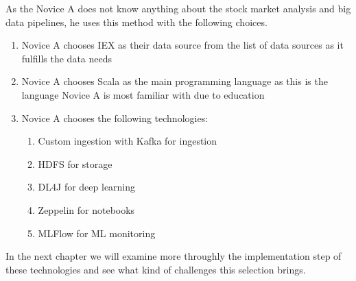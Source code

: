 As the Novice A does not know anything about the stock market analysis and big data pipelines, he uses this method with the following choices.
\begin{enumerate}
    \item Novice A chooses IEX as their data source from the list of data sources as it fulfills the data needs
    \item Novice A chooses Scala as the main programming language as this is the language Novice A is most familiar with due to education
    \item Novice A chooses the following technologies:
    \begin{enumerate}
        \item Custom ingestion with Kafka for ingestion
        \item HDFS for storage
        \item DL4J for deep learning
        \item Zeppelin for notebooks
        \item MLFlow for ML monitoring
    \end{enumerate}
\end{enumerate}

In the next chapter we will examine more throughly the implementation step of these technologies and see what kind of challenges this selection brings.




